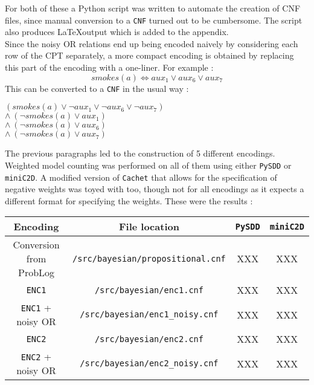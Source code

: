 \begin{multicols*}{2}
\noindent For both of these a Python script was written to automate the creation of CNF files, since manual conversion to a \texttt{CNF} turned out to be cumbersome. The script also produces \LaTeX output which is added to the appendix.\\

\noindent Since the noisy OR relations end up being encoded naively by considering each row of the CPT separately, a more compact encoding is obtained by replacing this part of the encoding with a one-liner. For example :
$$smokes(a)\Leftrightarrow aux_1 \lor aux_6 \lor aux_7$$
\noindent This can be converted to a \texttt{CNF} in the usual way :\\\par\noindent
$(smokes(a) \lor \lnot aux_1\lor\lnot aux_6\lor\lnot aux_7)$\\
$\land\ (\lnot smokes(a) \lor aux_1)$\\
$\land\ (\lnot smokes(a) \lor aux_6)$\\
$\land\ (\lnot smokes(a) \lor aux_7)$

\end{multicols*}



The previous paragraphs led to the construction of 5 different encodings. Weighted model counting was performed on all of them using either \texttt{PySDD} or \texttt{miniC2D}. A modified version of \texttt{Cachet} that allows for the specification of negative weights was toyed with too, though not for all encodings as it expects a different format for specifying the weights. These were the results :
\begin{center}
\begin{tabular}{cc|cc}
Encoding & File location & \texttt{PySDD} & \texttt{miniC2D} \\\hline
Conversion from ProbLog & \texttt{/src/bayesian/propositional.cnf} & XXX & XXX\\
\texttt{ENC1} & \texttt{/src/bayesian/enc1.cnf} & XXX & XXX\\
\texttt{ENC1} + noisy OR & \texttt{/src/bayesian/enc1\_noisy.cnf} & XXX & XXX\\
\texttt{ENC2} & \texttt{/src/bayesian/enc2.cnf} & XXX & XXX\\
\texttt{ENC2} + noisy OR & \texttt{/src/bayesian/enc2\_noisy.cnf} & XXX & XXX\\
\end{tabular}
\end{center}

